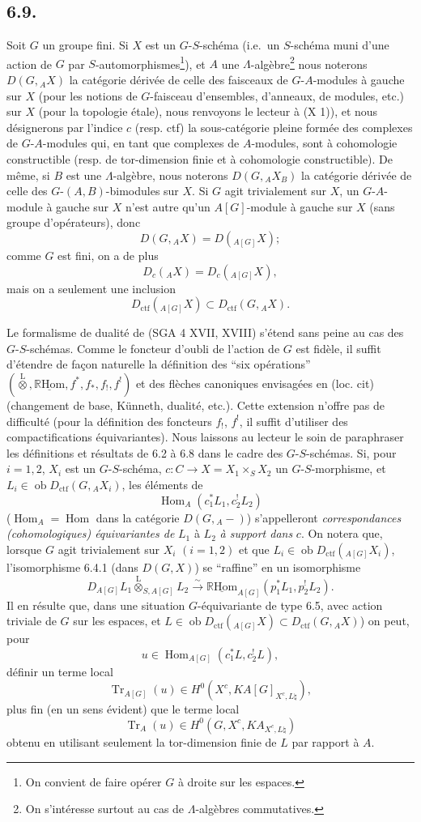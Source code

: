 \documentclass[11pt]{article}
\DeclareMathOperator{\Hom}{Hom}
\newcommand{\R}{\mathbb{R}}\newcommand{\RHomCore}{\mathbb{R}\mathrm{Hom}}
\providecommand{\RHom}{\RHomCore}
\providecommand{\uRHom}{\underline{\RHom}}
\providecommand{\Tr}{\operatorname{Tr}}
\providecommand{\Tr}{\operatorname{Tr}}
\providecommand{\lten}{\overset{\mathrm L}{\otimes}}
\providecommand{\Ob}{\operatorname{ob}}
\providecommand{\Tr}{\operatorname{Tr}}
\providecommand{\RHom}{\RHomCore}
\providecommand{\Hom}{\operatorname{Hom}}
\providecommand{\lten}{\overset{\mathrm L}{\otimes}}
\providecommand{\RHom}{\R\mathcal{H}om}
\providecommand{\lten}{\overset{\mathrm L}{\otimes}}
\providecommand{\Ob}{\operatorname{ob}}
\providecommand{\R}{\mathrm R}
\providecommand{\Tr}{\operatorname{Tr}}
\providecommand{\lten}{\overset{\mathrm L}{\otimes}}
\providecommand{\lten}{\overset{\mathrm L}{\otimes}}
\providecommand{\Ob}{\operatorname{Ob}}
\providecommand{\lten}{\overset{\mathrm L}{\otimes}}
\providecommand{\RHom}{\RHomCore}
\providecommand{\Hom}{\operatorname{Hom}}
\providecommand{\Tr}{\operatorname{Tr}}
\providecommand{\Ob}{\operatorname{ob}}
\providecommand{\Ob}{\operatorname{Ob}}
\providecommand{\lten}{\overset{\mathrm L}{\otimes}}
\begin{document}
\subsection*{6.9.}
Soit $G$ un groupe fini. Si $X$ est un $G$-$S$-schéma (i.e.~un $S$-schéma muni d'une action de $G$ par $S$-automorphismes\footnote{On convient de faire opérer $G$ à droite sur les espaces.}), et $A$ une $\Lambda$-algèbre\footnote{On s'intéresse surtout au cas de $\Lambda$-algèbres commutatives.} nous noterons $D(G,{}_AX)$ la catégorie dérivée de celle des faisceaux de $G$-$A$-modules à gauche sur $X$ (pour les notions de $G$-faisceau d'ensembles, d'anneaux, de modules, etc.) sur $X$ (pour la topologie étale), nous renvoyons le lecteur à (X 1)), et nous
désignerons par l'indice $c$ (resp. ctf) la sous-catégorie pleine formée des complexes de $G$-$A$-modules qui, en tant que complexes de $A$-modules, sont à cohomologie constructible (resp. de tor-dimension finie et à cohomologie constructible). De même, si $B$ est une $\Lambda$-algèbre, nous noterons $D(G,{}_AX_B)$ la catégorie dérivée de celle des $G$-$(A,B)$-bimodules sur $X$. Si $G$ agit trivialement sur $X$, un $G$-$A$-module à gauche sur $X$ n'est autre qu'un $A[G]$-module à gauche sur $X$ (sans groupe d'opérateurs), donc
\[
D(G,{}_AX)=D({}_{A[G]}X);
\]
comme $G$ est fini, on a de plus
\[
D_c({}_AX)=D_c({}_{A[G]}X),
\]
mais on a seulement une inclusion
\[
D_{\mathrm{ctf}}({}_{A[G]}X)\subset D_{\mathrm{ctf}}(G,{}_AX).
\]

Le formalisme de dualité de (SGA 4 XVII, XVIII) s'étend sans peine au cas des $G$-$S$-schémas. Comme le foncteur d'oubli de l'action de $G$ est fidèle, il suffit d'étendre de façon naturelle la définition des ``six opérations'' $(\lten,\uRHom,f^*,f_*,f_!,f^!)$ et des flèches canoniques envisagées en (loc. cit) (changement de base, Künneth, dualité, etc.). Cette extension n'offre pas de difficulté (pour la définition des foncteurs $f_!$, $f^!$, il suffit d'utiliser des compactifications équivariantes). Nous laissons au lecteur le soin de paraphraser les définitions et résultats de 6.2 à 6.8 dans le cadre des $G$-$S$-schémas. Si, pour $i=1,2$, $X_i$ est un $G$-$S$-schéma, $c:C\to X=X_1\times_SX_2$ un $G$-$S$-morphisme, et $L_i\in\Ob D_{\mathrm{ctf}}(G,{}_AX_i)$, les éléments de
\[
\Hom_A(c_1^*L_1,c_2^!L_2)
\]
($\Hom_A=\Hom$ dans la catégorie $D(G,{}_A-)$) s'appelleront \emph{correspondances (cohomologiques) équivariantes de} $L_1$ à $L_2$ \emph{à support dans} $c$. On notera que, lorsque $G$ agit trivialement sur $X_i$ $(i=1,2)$ et que $L_i\in\Ob D_{\mathrm{ctf}}({}_{A[G]}X_i)$, l'isomorphisme 6.4.1 (dans $D(G,X)$) se ``raffine'' en un isomorphisme
\[
D_{A[G]}L_1\lten_{S,A[G]}L_2
\xrightarrow{\sim}
\uRHom_{A[G]}(p_1^*L_1,p_2^!L_2).
\]
Il en résulte que, dans une situation $G$-équivariante de type 6.5, avec action triviale de $G$ sur les espaces, et $L\in\Ob D_{\mathrm{ctf}}({}_{A[G]}X)\subset D_{\mathrm{ctf}}(G,{}_AX)$) on peut, pour
\[
u\in\Hom_{A[G]}(c_1^*L,c_2^!L),
\]
définir un terme local
\[
\Tr_{A[G]}(u)\in H^0(X^c,KA[G]_{X^c,L\natural}),
\]
plus fin (en un sens évident) que le terme local
\[
\Tr_A(u)\in H^0(G,X^c,KA_{X^c,L\natural})
\]
obtenu en utilisant seulement la tor-dimension finie de $L$ par rapport à $A$.
\end{document}
